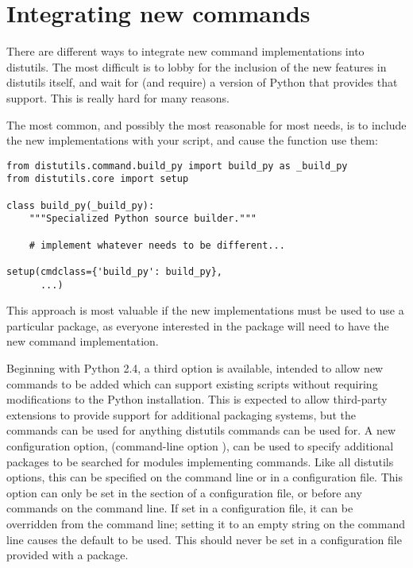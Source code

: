 \documentclass{manual}
\begin{document}


\section{Integrating new commands}

There are different ways to integrate new command implementations into
distutils.  The most difficult is to lobby for the inclusion of the
new features in distutils itself, and wait for (and require) a version
of Python that provides that support.  This is really hard for many
reasons.

The most common, and possibly the most reasonable for most needs, is
to include the new implementations with your  script,
and cause the  function use them:

\begin{verbatim}
from distutils.command.build_py import build_py as _build_py
from distutils.core import setup

class build_py(_build_py):
    """Specialized Python source builder."""

    # implement whatever needs to be different...

setup(cmdclass={'build_py': build_py},
      ...)
\end{verbatim}

This approach is most valuable if the new implementations must be used
to use a particular package, as everyone interested in the package
will need to have the new command implementation.

Beginning with Python 2.4, a third option is available, intended to
allow new commands to be added which can support existing
 scripts without requiring modifications to the Python
installation.  This is expected to allow third-party extensions to
provide support for additional packaging systems, but the commands can
be used for anything distutils commands can be used for.  A new
configuration option,  (command-line option
), can be used to specify additional
packages to be searched for modules implementing commands.  Like all
distutils options, this can be specified on the command line or in a
configuration file.  This option can only be set in the
\code{[global]} section of a configuration file, or before any
commands on the command line.  If set in a configuration file, it can
be overridden from the command line; setting it to an empty string on
the command line causes the default to be used.  This should never be
set in a configuration file provided with a package.
\end{document}

